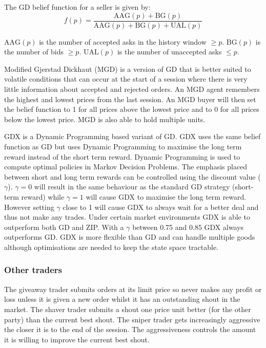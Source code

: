 \documentclass[preprint]{acm_proc_article-sp} %
\begin{document}
The GD belief function for a seller is given by:
\begin{equation}
  f(p) = \frac{\text{AAG}(p) + \text{BG}(p)}{\text{AAG}(p) + \text{BG}(p) +
  \text{UAL}(p)}
\end{equation}

$\text{AAG}(p)$ is the number of accepted asks in the history window $\geq p$.
$\text{BG}(p)$ is
the number of bids $\geq p$. $\text{UAL}(p)$ is the number of unaccepted asks $\leq p$.

Modified Gjerstad Dickhaut (MGD) \cite{mgd} is a version of GD that
is better suited to volatile conditions that can occur at the start of a
session where there is very little information about accepted and rejected
orders.
An MGD agent remembers the highest and lowest prices from the last session.
An MGD buyer will then set the belief function to 1 for all prices above the
lowest price and to 0 for all prices below the lowest price.
MGD is also able to hold multiple units.

GDX \cite{gdx} is a Dynamic Programming based variant of GD.
GDX uses the same belief function as GD but uses Dynamic Programming to
maximise the long term reward instead of the short term reward.
Dynamic Programming is used to compute optimal policies in Markov Decision
Problems.
The emphasis placed between short and long term rewards can be controlled using
the discount value ($\gamma$).
$\gamma = 0$ will result in the same behaviour as the standard GD strategy
(short-term reward) while $\gamma = 1$ will cause GDX to maximise the long term
reward.
However setting $\gamma$ close to 1 will cause GDX to always wait for a better
deal and thus not make any trades.
Under certain market environments GDX is able to outperform
both GD and ZIP.
With a $\gamma$ between 0.75 and 0.85 GDX always outperforms GD.
GDX is more flexible than GD and can handle multiple goods although
optimisations are needed to keep the state space tractable.\\



\subsubsection{Other traders}
The giveaway trader submits orders at its limit price so never makes any profit
or loss unless it is given a new order whilst it has an outstanding shout in
the market. The shaver trader submits a shout one price unit better (for the
other party) than the current best shout. The sniper trader gets increasingly
aggressive the closer it is to the end of the session. The aggressiveness
controls the amount it is willing to improve the current best shout.\\
\end{document}
